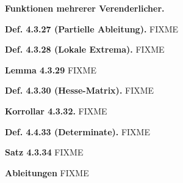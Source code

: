 \textbf{Funktionen mehrerer Verenderlicher.}

\textbf{Def. 4.3.27 (Partielle Ableitung).} FIXME

\textbf{Def. 4.3.28 (Lokale Extrema).} FIXME

\textbf{Lemma 4.3.29} FIXME

\textbf{Def. 4.3.30 (Hesse-Matrix).} FIXME

\textbf{Korrollar 4.3.32.} FIXME

\textbf{Def. 4.4.33 (Determinate).} FIXME

\textbf{Satz 4.3.34} FIXME

\textbf{Ableitungen} FIXME

